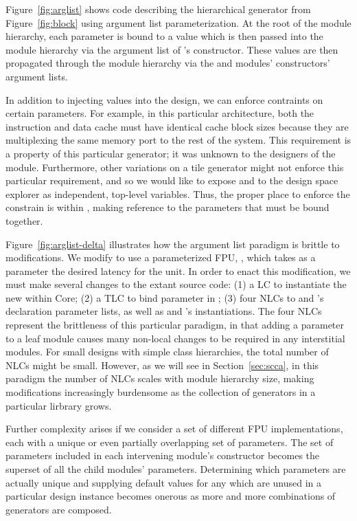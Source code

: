Figure~\ref{fig:arglist} shows code describing the hierarchical  generator from Figure~\ref{fig:block} using argument list parameterization.
At the root of the module hierarchy, each parameter is bound to a value which is then passed into the module hierarchy via the argument list of 's constructor.
These values are then propagated through the module hierarchy via the  and  modules' constructors' argument lists.

In addition to injecting values into the design, we can enforce contraints on certain parameters.
For example, in this particular  architecture, both the instruction and data cache must have identical cache block sizes
because they are multiplexing the same memory port to the rest of the system.
This requirement is a property of this particular  generator; it was unknown to the designers of the  module.
Furthermore, other variations on a tile generator might not enforce this particular requirement, and so we would like to expose
 and  to the design space explorer as independent, top-level variables.
Thus, the proper place to enforce the constrain is within , making reference to the parameters that must be bound together.

Figure~\ref{fig:arglist-delta} illustrates how the argument list paradigm is brittle to modifications. 
We modify  to use a parameterized FPU, , which takes as a parameter the desired latency for the unit.
In order to enact this modification, we must make several changes to the extant source code:
(1) a LC to instantiate the new  within Core;
(2) a TLC to bind parameter  in ;
(3) four NLCs to  and 's declaration parameter lists, as well as  and 's instantiations.
The four NLCs represent the brittleness of this particular paradigm, in that adding a parameter to a leaf module causes many non-local changes to be required in any interstitial modules.
For small designs with simple class hierarchies, the total number of NLCs might be small.
However, as we will see in Section~\ref{sec:scca}, in this paradigm the number of NLCs scales with module hierarchy size, making modifications increasingly burdensome
as the collection of generators in a particular lirbrary grows.

Further complexity arises if we consider a set of different FPU implementations, each with a unique or even partially overlapping set of parameters.
The set of parameters included in each intervening module's constructor becomes the superset of all the child modules' parameters.
Determining which parameters are actually unique and supplying default values for any which are unused in a particular design instance becomes onerous
as more and more combinations of generators are composed.


